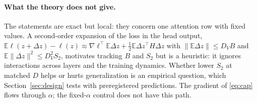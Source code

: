 \paragraph{What the theory does not give.} The statements are exact but local: they concern one
attention row with fixed values. A second-order expansion of the loss in the head output,
$\mathbb E\ell(z+\Delta z)-\ell(z)\approx\nabla\ell^\top\mathbb E\Delta z+\tfrac12\mathbb E\Delta z^\top H\Delta z$ with
$\lVert\mathbb E\Delta z\rVert\le D_VB$ and $\mathbb E\lVert\Delta z\rVert^2\le D_V^2S_2$, motivates tracking $B$ and $S_2$ but
is a heuristic: it ignores interactions across layers and the training dynamics. Whether lower $S_2$ at matched $D$
helps or hurts generalization is an empirical question, which Section~\ref{sec:design} tests with preregistered
predictions. The gradient of \eqref{eq:cap} flows through $\alpha$; the fixed-$\alpha$ control does not have this path.

